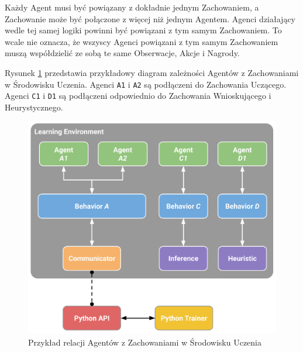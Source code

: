 Każdy Agent musi być powiązany z dokładnie jednym Zachowaniem, a Zachowanie może być połączone z więcej niż jednym Agentem. Agenci działający wedle tej samej logiki powinni być powiązani z tym samym Zachowaniem. To wcale nie oznacza, że wszyscy Agenci powiązani z tym samym Zachowaniem muszą współdzielić ze sobą te same Obserwacje, Akcje i Nagrody.

Rysunek \ref{UnityMlaExample} przedstawia przykładowy diagram zależności Agentów z Zachowaniami w Środowisku Uczenia. Agenci \texttt{A1} i \texttt{A2} są podłączeni do Zachowania Uczącego. Agenci \texttt{C1} i \texttt{D1} są podłączeni odpowiednio do Zachowania Wnioskującego i Heurystycznego.

\begin{figure}[h]
\begin{center}
\includegraphics[width=15cm]{resources/figures/learning_environment_example.png}
\caption{Przykład relacji Agentów z Zachowaniami w Środowisku Uczenia}
\label{UnityMlaExample}
\end{center}
\end{figure}


